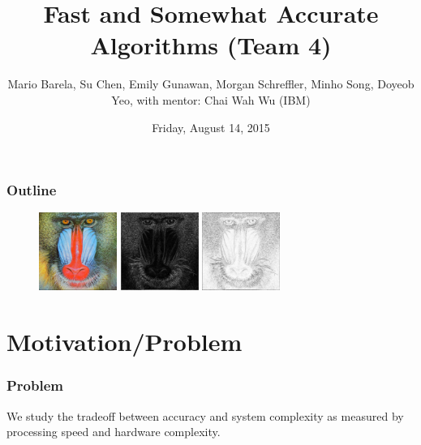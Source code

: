 \documentclass{beamer}
\title[Fast Somewhat Accurate Algorithms]{Fast and Somewhat Accurate Algorithms (Team 4)}
\author[Team 4]{Mario Barela, Su Chen,
Emily Gunawan,
Morgan Schreffler, Minho Song,
Doyeob Yeo, with mentor:
Chai Wah Wu (IBM)}
\date[Final Presentation]{Friday, August 14, 2015}
\institute[IMA]{IMA: Modeling in Industry Final Presentation}
\begin{document}
\begin{frame}
\titlepage %
\end{frame}


\begin{frame}
\frametitle{Outline}
  \begin{figure}[htb]
  \begin{center}
  \mbox{\includegraphics[height=1in]{BaboonRGB.jpg}}
\mbox{\includegraphics[height=1in]{Baboon_after_sobel_magnitude.jpg}}
\mbox{\includegraphics[height=1in]{Baboon_after_sobel_magnitude_inverse.jpg}}
 
  \end{center}
  \end{figure}

\tableofcontents %
\end{frame}

\section{Motivation/Problem}

\begin{frame}
\frametitle{Problem}
We study the tradeoff between accuracy and system complexity as measured by processing speed and hardware complexity.

\end{frame}
\end{document}
